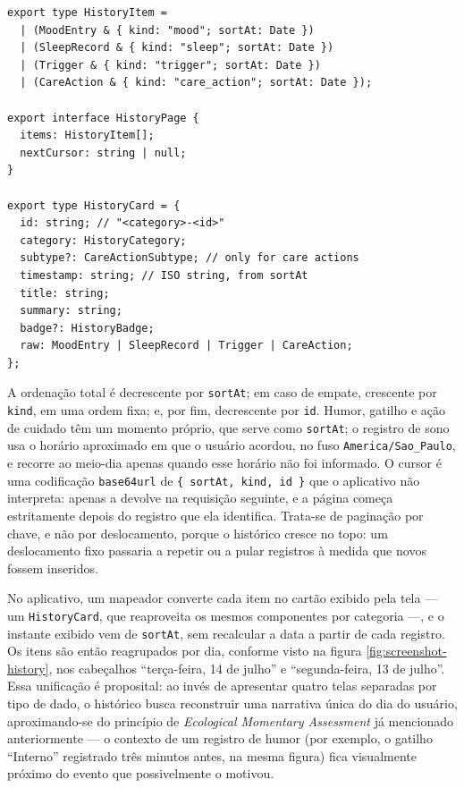 \begin{lstlisting}[caption={Formatos do histórico no servidor e no cartão da tela}, label={lst:history-card}]
export type HistoryItem =
  | (MoodEntry & { kind: "mood"; sortAt: Date })
  | (SleepRecord & { kind: "sleep"; sortAt: Date })
  | (Trigger & { kind: "trigger"; sortAt: Date })
  | (CareAction & { kind: "care_action"; sortAt: Date });

export interface HistoryPage {
  items: HistoryItem[];
  nextCursor: string | null;
}

export type HistoryCard = {
  id: string; // "<category>-<id>"
  category: HistoryCategory;
  subtype?: CareActionSubtype; // only for care actions
  timestamp: string; // ISO string, from sortAt
  title: string;
  summary: string;
  badge?: HistoryBadge;
  raw: MoodEntry | SleepRecord | Trigger | CareAction;
};
\end{lstlisting}

A ordenação total é decrescente por \texttt{sortAt}; em caso de empate,
crescente por \texttt{kind}, em uma ordem fixa; e, por fim, decrescente por
\texttt{id}. Humor, gatilho e ação de cuidado têm um momento próprio, que
serve como \texttt{sortAt}; o registro de sono usa o horário aproximado em
que o usuário acordou, no fuso \texttt{America/Sao\_Paulo}, e recorre ao
meio-dia apenas quando esse horário não foi informado. O cursor é uma
codificação \texttt{base64url}
de \texttt{\{ sortAt, kind, id \}} que o aplicativo não interpreta: apenas
a devolve na requisição seguinte, e a página começa estritamente depois do
registro que ela identifica. Trata-se de paginação por chave, e não por
deslocamento, porque o histórico cresce no topo: um deslocamento fixo
passaria a repetir ou a pular registros à medida que novos fossem
inseridos.

No aplicativo, um mapeador converte cada item no cartão exibido pela
tela --- um \texttt{HistoryCard}, que reaproveita os mesmos componentes
por categoria ---, e o instante exibido vem de \texttt{sortAt}, sem
recalcular a data a partir de cada registro. Os itens são então
reagrupados por dia, conforme visto na figura
\ref{fig:screenshot-history}, nos cabeçalhos ``terça-feira, 14 de julho''
e ``segunda-feira, 13 de julho''. Essa unificação é proposital:
ao invés de apresentar quatro telas separadas por tipo de dado, o
histórico busca reconstruir uma narrativa única do dia do usuário,
aproximando-se do princípio de \textit{Ecological Momentary Assessment}
já mencionado anteriormente --- o contexto de um registro de humor (por
exemplo, o gatilho ``Interno'' registrado três minutos antes, na mesma
figura) fica visualmente próximo do evento que possivelmente o motivou.

